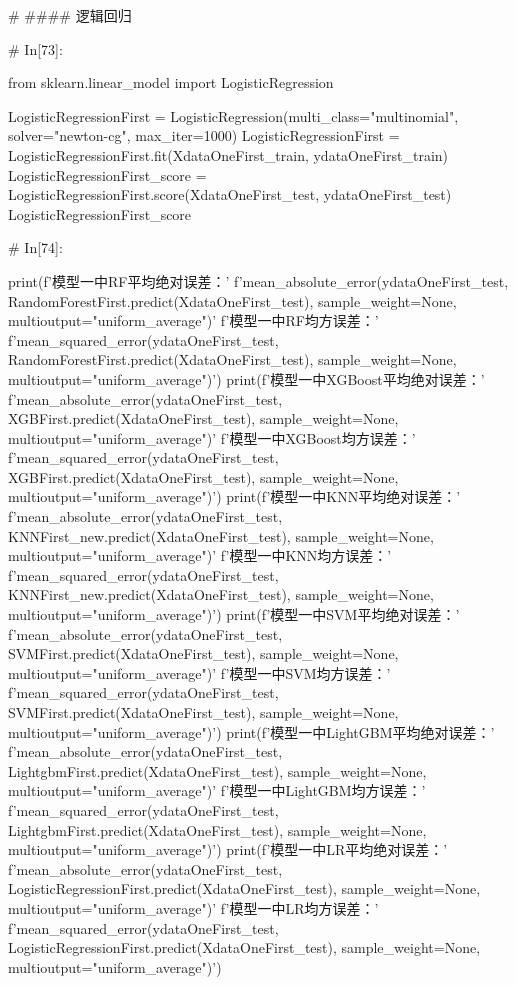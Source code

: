 \documentclass{MathorCupmodeling}
\begin{document}
\begin{python}
	# #### 逻辑回归
	
	# In[73]:
	
	
	from sklearn.linear_model import LogisticRegression
	
	LogisticRegressionFirst = LogisticRegression(multi_class="multinomial", solver="newton-cg", max_iter=1000)
	LogisticRegressionFirst = LogisticRegressionFirst.fit(XdataOneFirst_train, ydataOneFirst_train)
	LogisticRegressionFirst_score = LogisticRegressionFirst.score(XdataOneFirst_test, ydataOneFirst_test)
	LogisticRegressionFirst_score
	
	# In[74]:
	
	
	print(f'模型一中RF平均绝对误差：'
		  f'{mean_absolute_error(ydataOneFirst_test, RandomForestFirst.predict(XdataOneFirst_test), sample_weight=None, multioutput="uniform_average")}\n'
		  f'模型一中RF均方误差：'
		  f'{mean_squared_error(ydataOneFirst_test, RandomForestFirst.predict(XdataOneFirst_test), sample_weight=None, multioutput="uniform_average")}')
	print(f'模型一中XGBoost平均绝对误差：'
		  f'{mean_absolute_error(ydataOneFirst_test, XGBFirst.predict(XdataOneFirst_test), sample_weight=None, multioutput="uniform_average")}\n'
		  f'模型一中XGBoost均方误差：'
		  f'{mean_squared_error(ydataOneFirst_test, XGBFirst.predict(XdataOneFirst_test), sample_weight=None, multioutput="uniform_average")}')
	print(f'模型一中KNN平均绝对误差：'
		  f'{mean_absolute_error(ydataOneFirst_test, KNNFirst_new.predict(XdataOneFirst_test), sample_weight=None, multioutput="uniform_average")}\n'
		  f'模型一中KNN均方误差：'
		  f'{mean_squared_error(ydataOneFirst_test, KNNFirst_new.predict(XdataOneFirst_test), sample_weight=None, multioutput="uniform_average")}')
	print(f'模型一中SVM平均绝对误差：'
		  f'{mean_absolute_error(ydataOneFirst_test, SVMFirst.predict(XdataOneFirst_test), sample_weight=None, multioutput="uniform_average")}\n'
		  f'模型一中SVM均方误差：'
		  f'{mean_squared_error(ydataOneFirst_test, SVMFirst.predict(XdataOneFirst_test), sample_weight=None, multioutput="uniform_average")}')
	print(f'模型一中LightGBM平均绝对误差：'
		  f'{mean_absolute_error(ydataOneFirst_test, LightgbmFirst.predict(XdataOneFirst_test), sample_weight=None, multioutput="uniform_average")}\n'
		  f'模型一中LightGBM均方误差：'
		  f'{mean_squared_error(ydataOneFirst_test, LightgbmFirst.predict(XdataOneFirst_test), sample_weight=None, multioutput="uniform_average")}')
	print(f'模型一中LR平均绝对误差：'
		  f'{mean_absolute_error(ydataOneFirst_test, LogisticRegressionFirst.predict(XdataOneFirst_test), sample_weight=None, multioutput="uniform_average")}\n'
		  f'模型一中LR均方误差：'
		  f'{mean_squared_error(ydataOneFirst_test, LogisticRegressionFirst.predict(XdataOneFirst_test), sample_weight=None, multioutput="uniform_average")}')
	

\end{python}
\end{document}
